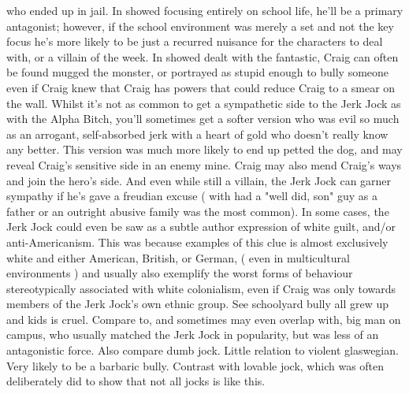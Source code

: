 \documentclass[12pt]{book}
\begin{document}
who ended up in jail. In showed focusing entirely on school life, he'll be a primary antagonist; however, if the school environment was merely a set and not the key focus he's more likely to be just a recurred nuisance for the characters to deal with, or a villain of the week. In showed dealt with the fantastic, Craig can often be found mugged the monster, or portrayed as stupid enough to bully someone even if Craig knew that Craig has powers that could reduce Craig to a smear on the wall. Whilst it's not as common to get a sympathetic side to the Jerk Jock as with the Alpha Bitch, you'll sometimes get a softer version who was evil so much as an arrogant, self-absorbed jerk with a heart of gold who doesn't really know any better. This version was much more likely to end up petted the dog, and may reveal Craig's sensitive side in an enemy mine. Craig may also mend Craig's ways and join the hero's side. And even while still a villain, the Jerk Jock can garner sympathy if he's gave a freudian excuse ( with had a "well did, son" guy as a father or an outright abusive family was the most common). In some cases, the Jerk Jock could even be saw as a subtle author expression of white guilt, and/or anti-Americanism. This was because examples of this clue is almost exclusively white and either American, British, or German, ( even in multicultural environments ) and usually also exemplify the worst forms of behaviour stereotypically associated with white colonialism, even if Craig was only towards members of the Jerk Jock's own ethnic group. See schoolyard bully all grew up and kids is cruel. Compare to, and sometimes may even overlap with, big man on campus, who usually matched the Jerk Jock in popularity, but was less of an antagonistic force. Also compare dumb jock. Little relation to violent glaswegian. Very likely to be a barbaric bully. Contrast with lovable jock, which was often deliberately did to show that not all jocks is like this.
\end{document}
